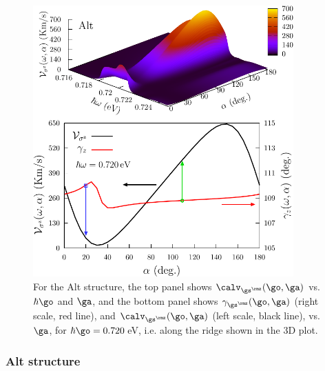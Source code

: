 \documentclass[floatfix,prb,aps,superscriptaddress,showpacs,11pt,preprint,letterpaper]{revtex4}
\def\tama{10cm}
\begin{document}
\begin{figure}[tb]
\centering
\includegraphics[width=\tama]{altplots/alt-vsz}
\caption{For the Alt structure, the top panel shows $\calv_{\gs^\rmz}
(\go,\ga)$ vs. $\hbar\go$ and $\ga$, and the bottom panel shows
$\gamma_{\gs^\rmz} (\go,\ga)$ (right scale, red line), and $\calv_{\gs^\rmz}
(\go,\ga)$ (left scale, black line), vs. $\ga$, for $\hbar\go=0.720$\,eV, i.e.
along the ridge shown in the 3D plot.}
\label{fig:alt-vsz}
\end{figure}

\subsubsection{Alt structure}
\end{document}
